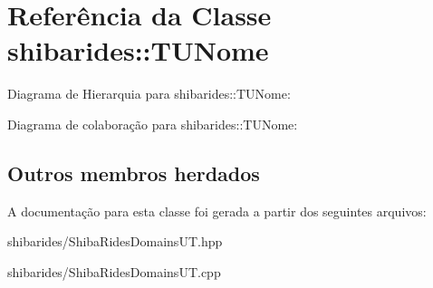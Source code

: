\hypertarget{classshibarides_1_1TUNome}{}\section{Referência da Classe shibarides\+:\+:T\+U\+Nome}
\label{classshibarides_1_1TUNome}


Diagrama de Hierarquia para shibarides\+:\+:T\+U\+Nome\+:


Diagrama de colaboração para shibarides\+:\+:T\+U\+Nome\+:
\subsection*{Outros membros herdados}


A documentação para esta classe foi gerada a partir dos seguintes arquivos\+:\begin{DoxyCompactItemize}
\item 
shibarides/Shiba\+Rides\+Domains\+U\+T.\+hpp\item 
shibarides/Shiba\+Rides\+Domains\+U\+T.\+cpp\end{DoxyCompactItemize}
